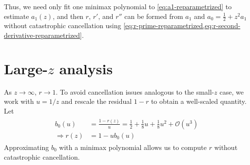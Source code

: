 \documentclass{article}
\begin{document}
Thus, we need only fit one minimax polynomial to \cref{eq:a1-reparametrized} to estimate $a_1(z)$, and then $r$, $r'$, and $r''$ can be formed from $a_1$ and $a_0 = \frac{1}{2} + z^2 a_1$ without catastrophic cancellation using \cref{eq:r-prime-reparametrized,eq:r-second-derivative-reparametrized}.



\section{Large-$z$ analysis}\label{sec:rician-large-z}

As $z \to \infty$, $r \to 1$.
To avoid cancellation issues analogous to the small-$z$ case, we work with $u=1/z$ and rescale the residual $1-r$ to obtain a well-scaled quantity.
Let
%
\begin{align}
  \boxed{
    \begin{aligned}
      b_0(u)           & = \frac{1-r(z)}{u} = \frac{1}{2} + \frac{1}{8} u + \frac{1}{8} u^2 + \mathcal{O}(u^3) \\
      \Rightarrow r(z) & = 1 - u b_0(u) \label{eq:r-large-reparametrized}
    \end{aligned}
  }
\end{align}
%
Approximating $b_0$ with a minimax polynomial allows us to compute $r$ without catastrophic cancellation.
\end{document}
